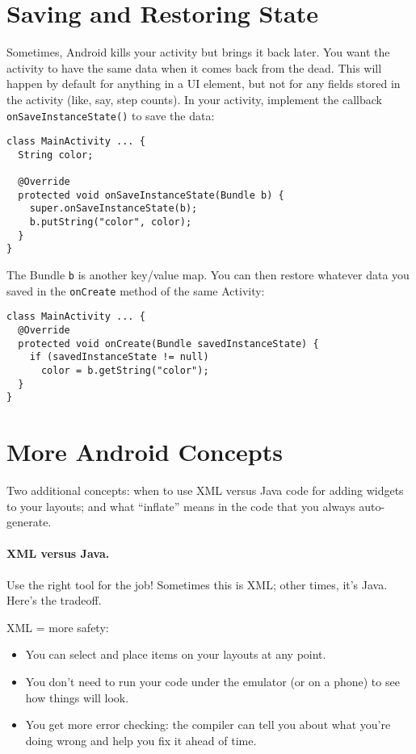 \section*{Saving and Restoring State}
Sometimes, Android kills your activity but brings it back later. You
want the activity to have the same data when it comes back from the
dead. This will happen by default for anything in a UI element, but
not for any fields stored in the activity (like, say, step counts). In
your activity, implement the callback {\tt onSaveInstanceState()} to
save the data:

{
\begin{verbatim}
class MainActivity ... {
  String color;

  @Override
  protected void onSaveInstanceState(Bundle b) {
    super.onSaveInstanceState(b);
    b.putString("color", color);
  }
}
\end{verbatim}
}
The Bundle {\tt b} is another key/value map. You can then restore whatever
data you saved in the {\tt onCreate} method of the same Activity:
{
\begin{verbatim}
class MainActivity ... {
  @Override
  protected void onCreate(Bundle savedInstanceState) {
    if (savedInstanceState != null)
      color = b.getString("color");
  }
}
\end{verbatim}
}

\section*{More Android Concepts}
Two additional concepts: when to use XML versus Java
code for adding widgets to your layouts; and what ``inflate'' means
in the code that you always auto-generate.

\paragraph{XML versus Java.}
Use the right tool for the job! Sometimes this is XML; other times,
it's Java. Here's the tradeoff.

XML = more safety:
\begin{itemize}
\item You can select and place items on your layouts at any point.
\item You don't need to run your code under the emulator (or on a
  phone) to see how things will look.
\item You get more error checking: the compiler can tell you about
what you're doing wrong and help you fix it ahead of time.
\end{itemize}

